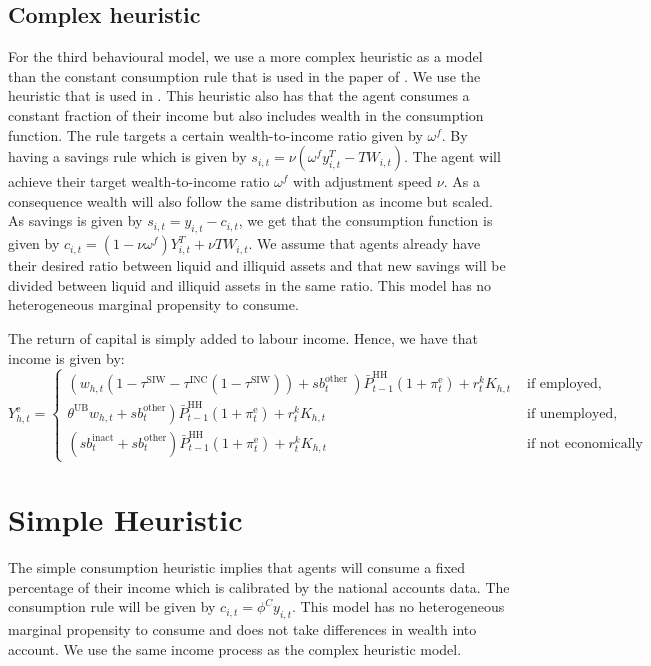 \subsection{Complex heuristic}
For the third behavioural model, we use a more complex heuristic as a model than the constant consumption rule that is used in the paper of \cite{poledna_economic_2019}. We use the heuristic that is used in \cite{deissenberg_eurace_2008}. This heuristic also has that the agent consumes a constant fraction of their income but also includes wealth in the consumption function. The rule targets a certain wealth-to-income ratio given by $\omega^f$. By having a savings rule which is given by $s_{i,t} = \nu ( \omega^f y^T_{i,t}-TW_{i,t})$. The agent will achieve their target wealth-to-income ratio $\omega^f$ with adjustment speed $\nu$. As a consequence wealth will also follow the same distribution as income but scaled. As savings is given by $s_{i,t} = y_{i,t} - c_{i,t}$, we get that the consumption function is given by $c_{i,t} = (1-\nu \omega^f) Y^T_{i,t} + \nu  TW_{i,t}.$ We assume that agents already have their desired ratio between liquid and illiquid assets and that new savings will be divided between liquid and illiquid assets in the same ratio. This model has no heterogeneous marginal propensity to consume.

The return of capital is simply added to labour income. Hence, we have that income is given by:
\begin{equation}
{\displaystyle 
    Y_{h,t}^{\mathrm{e}}= \begin{cases}\left(w_{h,t}\left(1-\tau^{\mathrm{SIW}}-\tau^{\mathrm{INC}}\left(1-\tau^{\mathrm{SIW}}\right)\right)+s b^{\text {other }}_t\right) \bar{P}^{\mathrm{HH}}_{t-1}\left(1+\pi^{\mathrm{e}}_t\right) +r^k_t K_{h,t} & \text { if employed, } \\ \left.\theta^{\mathrm{UB}} w_{h,t}+s b^{\mathrm{other}}_t\right) \bar{P}^{\mathrm{HH}}_{t-1}\left(1+\pi^{\mathrm{e}}_t\right) +r^k_t K_{h,t}& \text { if unemployed, } \\ \left(s b^{\mathrm{inact}}_t+s b^{\mathrm{other}}_t\right) \bar{P}^{\mathrm{HH}}_{t-1}\left(1+\pi^{\mathrm{e}}_t\right) +r^k_t K_{h,t}& \text { if not economically active. } \end{cases}}
\end{equation}

\section{Simple Heuristic} 
The simple consumption heuristic implies that agents will consume a fixed percentage of their income which is calibrated by the national accounts data. The consumption rule will be given by $c_{i,t} = \phi^C y_{i,t}$. This model has no heterogeneous marginal propensity to consume and does not take differences in wealth into account. We use the same income process as the complex heuristic model.

